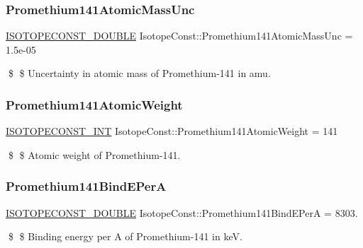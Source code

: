 \subsubsection{\texorpdfstring{Promethium141\+Atomic\+Mass\+Unc}{Promethium141AtomicMassUnc}}
{\footnotesize\ttfamily \mbox{\hyperlink{group___isotope_const-_macros_ga8f45a7272ce02c0b4c65c44636ed719a}{I\+S\+O\+T\+O\+P\+E\+C\+O\+N\+S\+T\+\_\+\+D\+O\+U\+B\+LE}} Isotope\+Const\+::\+Promethium141\+Atomic\+Mass\+Unc = 1.\+5e-\/05}

\$ \$ Uncertainty in atomic mass of Promethium-\/141 in amu. \mbox{\label{group___isotope_const-_promethium-_pm141_gafb1e18c84208c0ecf8f6dd3ad8d37541}} 
\subsubsection{\texorpdfstring{Promethium141\+Atomic\+Weight}{Promethium141AtomicWeight}}
{\footnotesize\ttfamily \mbox{\hyperlink{group___isotope_const-_macros_ga5f18360b3e99483a35c32d789e62621c}{I\+S\+O\+T\+O\+P\+E\+C\+O\+N\+S\+T\+\_\+\+I\+NT}} Isotope\+Const\+::\+Promethium141\+Atomic\+Weight = 141}

\$ \$ Atomic weight of Promethium-\/141. \mbox{\label{group___isotope_const-_promethium-_pm141_ga5f423c411516f46ca845dc8d9f77362b}} 
\subsubsection{\texorpdfstring{Promethium141\+Bind\+E\+PerA}{Promethium141BindEPerA}}
{\footnotesize\ttfamily \mbox{\hyperlink{group___isotope_const-_macros_ga8f45a7272ce02c0b4c65c44636ed719a}{I\+S\+O\+T\+O\+P\+E\+C\+O\+N\+S\+T\+\_\+\+D\+O\+U\+B\+LE}} Isotope\+Const\+::\+Promethium141\+Bind\+E\+PerA = 8303.}

\$ \$ Binding energy per A of Promethium-\/141 in keV. \mbox{\label{group___isotope_const-_promethium-_pm141_ga05e8ccea3a2aece07d737cefdc829f41}} 
